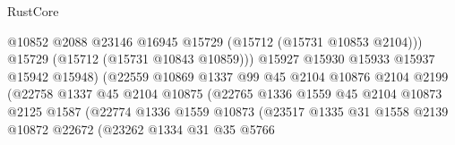 \begin{lexlean}{RustCore}
\begin{coremodule}
                                            @10852
                                            @2088
                                            @23146
                                            @16945
                                            @15729
                                            (@15712 (@15731 @10853 @2104)))
                                          @15729
                                          (@15712 (@15731 @10843 @10859)))
                                        @15927
                                        @15930
                                        @15933
                                        @15937
                                        @15942
                                        @15948)
                                      (@22559
                                        @10869
                                        @1337
                                        @99
                                        @45
                                        @2104
                                        @10876
                                        @2104
                                        @2199
                                        (@22758
                                          @1337
                                          @45
                                          @2104
                                          @10875
                                          (@22765
                                            @1336
                                            @1559
                                            @45
                                            @2104
                                            @10873
                                            @2125
                                            @1587
                                            (@22774
                                              @1336
                                              @1559
                                              @10873
                                              (@23517
                                                @1335
                                                @31
                                                @1558
                                                @2139
                                                @10872
                                                @22672
                                                (@23262
                                                  @1334
                                                  @31
                                                  @35
                                                  @5766

\end{coremodule}
\end{lexlean}
